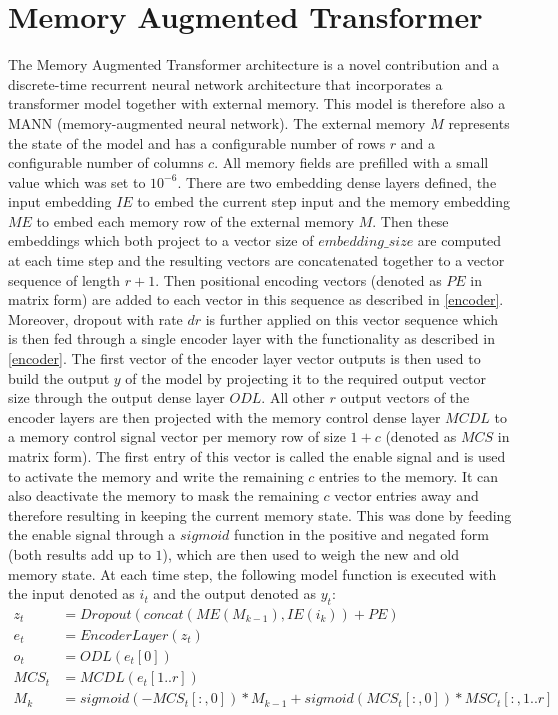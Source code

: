 \documentclass[draft,final]{vutinfth} %
\begin{document}
    \section{Memory Augmented Transformer} \label{mat}
    The Memory Augmented Transformer architecture is a novel contribution and a discrete-time recurrent neural network architecture that incorporates a transformer model together with external memory.
    This model is therefore also a MANN (memory-augmented neural network).
    The external memory $M$ represents the state of the model and has a configurable number of rows $r$ and a configurable number of columns $c$.
    All memory fields are prefilled with a small value which was set to $10^{-6}$.
    There are two embedding dense layers defined, the input embedding $IE$ to embed the current step input and the memory embedding $ME$ to embed each memory row of the external memory $M$.
    Then these embeddings which both project to a vector size of $embedding\_size$ are computed at each time step and the resulting vectors are concatenated together to a vector sequence of length $r+1$.
    Then positional encoding vectors (denoted as $PE$ in matrix form) are added to each vector in this sequence as described in \ref{encoder}.
    Moreover, dropout with rate $dr$ is further applied on this vector sequence which is then fed through a single encoder layer with the functionality as described in \ref{encoder}.
    The first vector of the encoder layer vector outputs is then used to build the output $y$ of the model by projecting it to the required output vector size through the output dense layer $ODL$.
    All other $r$ output vectors of the encoder layers are then projected with the memory control dense layer $MCDL$ to a memory control signal vector per memory row of size $1 + c$ (denoted as $MCS$ in matrix form).
    The first entry of this vector is called the enable signal and is used to activate the memory and write the remaining $c$ entries to the memory.
    It can also deactivate the memory to mask the remaining $c$ vector entries away and therefore resulting in keeping the current memory state.
    This was done by feeding the enable signal through a $sigmoid$ function in the positive and negated form (both results add up to $1$), which are then used to weigh the new and old memory state.
    At each time step, the following model function is executed with the input denoted as $i_t$ and the output denoted as $y_t$:
    \begin{align}
    z_t &= Dropout(concat(ME(M_{k-1}), IE(i_k)) + PE) \\
    e_t &= EncoderLayer(z_t) \\
    o_t &= ODL(e_t[0]) \\
    MCS_t &= MCDL(e_t[1..r]) \\
    M_k &= sigmoid(-MCS_t[:,0]) * M_{k-1} + sigmoid(MCS_t[:,0]) * MSC_t[:,1..r]
    \end{align}
\end{document}
